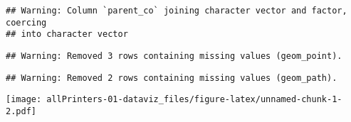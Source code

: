 \documentclass[]{article}
\newenvironment{Shaded}{\begin{snugshade}}{\end{snugshade}}
\newcommand{\DataTypeTok}[1]{\textcolor[rgb]{0.13,0.29,0.53}{#1}}
\newcommand{\DecValTok}[1]{\textcolor[rgb]{0.00,0.00,0.81}{#1}}
\newcommand{\KeywordTok}[1]{\textcolor[rgb]{0.13,0.29,0.53}{\textbf{#1}}}
\newcommand{\NormalTok}[1]{#1}
\newcommand{\OperatorTok}[1]{\textcolor[rgb]{0.81,0.36,0.00}{\textbf{#1}}}
\newcommand{\StringTok}[1]{\textcolor[rgb]{0.31,0.60,0.02}{#1}}
\begin{document}
\begin{verbatim}
## Warning: Column `parent_co` joining character vector and factor, coercing
## into character vector
\end{verbatim}

\begin{Shaded}
\end{Shaded}

\begin{verbatim}
## Warning: Removed 3 rows containing missing values (geom_point).
\end{verbatim}

\begin{verbatim}
## Warning: Removed 2 rows containing missing values (geom_path).
\end{verbatim}

\texttt{[image: allPrinters-01-dataviz\_files/figure-latex/unnamed-chunk-1-2.pdf]}
\end{document}
